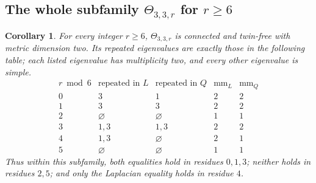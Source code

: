 \documentclass[11pt]{article}
\newtheorem{corollary}[theorem]{Corollary}
\newcommand{\mm}{\operatorname{mm}}
\newcommand{\Th}{\Theta}
\begin{document}
\subsection{The whole subfamily \texorpdfstring{$\Th_{3,3,r}$ for $r\geq6$}{Theta(3,3,r) for r >= 6}}
\begin{corollary}\label{cor:all-lengths}
For every integer $r\geq6$, $\Th_{3,3,r}$ is connected and twin-free with
metric dimension two. Its repeated eigenvalues are exactly those in the
following table; each listed eigenvalue has multiplicity two, and every
other eigenvalue is simple.
\[
\begin{array}{c|cc|cc}
 r\bmod6&\text{repeated in }L&\text{repeated in }Q&\mm_L&\mm_Q\\\hline
 0&3&1&2&2\\
 1&3&3&2&2\\
 2&\varnothing&\varnothing&1&1\\
 3&1,3&1,3&2&2\\
 4&1,3&\varnothing&2&1\\
 5&\varnothing&\varnothing&1&1
\end{array}
\]
Thus within this subfamily, both equalities hold in residues $0,1,3$;
neither holds in residues $2,5$; and only the Laplacian equality holds
in residue $4$.
\end{corollary}
\end{document}
